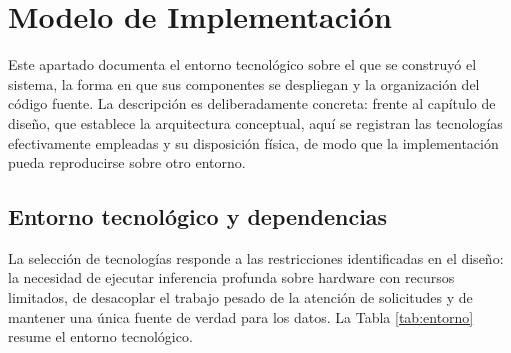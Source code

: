 \section{Modelo de Implementación}

Este apartado documenta el entorno tecnológico sobre el que se construyó el
sistema, la forma en que sus componentes se despliegan y la organización del
código fuente. La descripción es deliberadamente concreta: frente al capítulo de
diseño, que establece la arquitectura conceptual, aquí se registran las
tecnologías efectivamente empleadas y su disposición física, de modo que la
implementación pueda reproducirse sobre otro entorno.

\subsection{Entorno tecnológico y dependencias}

La selección de tecnologías responde a las restricciones identificadas en el
diseño: la necesidad de ejecutar inferencia profunda sobre hardware con recursos
limitados, de desacoplar el trabajo pesado de la atención de solicitudes y de
mantener una única fuente de verdad para los datos. La Tabla
\ref{tab:entorno} resume el entorno tecnológico.

